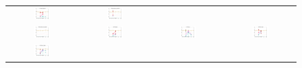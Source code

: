 \documentclass{article}
\begin{document}
\begin{figure}[htbp!]
\begin{tabular}{@{}c@{}c@{}c@{}c@{}}
\includegraphics[width=0.25\textwidth, trim=20mm 7mm 15mm 3mm, clip]{ppfigdim_f007}&
\includegraphics[width=0.25\textwidth, trim=20mm 7mm 15mm 3mm, clip]{ppfigdim_f008}\\
\includegraphics[width=0.25\textwidth, trim=20mm 7mm 15mm 3mm, clip]{ppfigdim_f009}&
\includegraphics[width=0.25\textwidth, trim=20mm 7mm 15mm 3mm, clip]{ppfigdim_f010}&
\includegraphics[width=0.25\textwidth, trim=20mm 7mm 15mm 3mm, clip]{ppfigdim_f011}&
\includegraphics[width=0.25\textwidth, trim=20mm 7mm 15mm 3mm, clip]{ppfigdim_f012}\\
\includegraphics[width=0.25\textwidth, trim=20mm 7mm 15mm 3mm, clip]{ppfigdim_f013}&

\end{tabular}
\end{figure}
\end{document}
